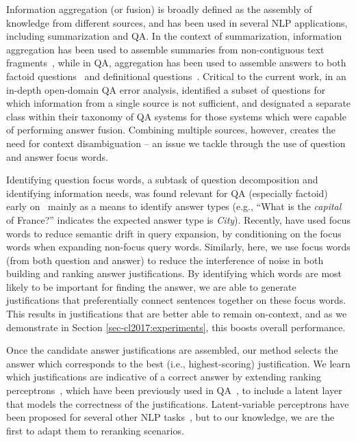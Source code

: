 Information aggregation (or fusion) is broadly defined as the assembly of knowledge from different sources, and has been used in several NLP applications, including summarization and QA.  In the context of summarization, information aggregation has been used to assemble summaries from non-contiguous text fragments~\citep[inter alia]{barzilay1999information,barzilay2005sentence}, while in QA, aggregation has been used to assemble answers to both factoid questions~\citep{pradhan2002building} and definitional questions~\citep{blair2003hybrid}.  Critical to the current work, in an in-depth open-domain QA error analysis, \citet{Moldovan:2003:PIE:763693.763694} identified a subset of questions for which information from a single source is not sufficient, and designated a separate class within their taxonomy of QA systems for those systems which were capable of performing answer fusion. Combining multiple sources, however, creates the need for context disambiguation -- an issue we tackle through the use of question and answer focus words.

Identifying question focus words, a subtask of question decomposition and identifying information needs, was found relevant for QA (especially factoid) early on~\citep[inter alia]{Harabagiu:00,Moldovan:2003:PIE:763693.763694} mainly as a means to identify answer types (e.g., ``What is the {\em capital} of France?'' indicates the expected answer type is \emph{City}).  
Recently, \citet{Park:2015} have used focus words to reduce semantic drift in query expansion, by conditioning on the focus words when expanding non-focus query words.
Similarly, here, we use focus words (from both question and answer) to reduce the interference of noise in both building and ranking answer justifications.  By identifying which words are most likely to be important for finding the answer, we are able to generate justifications that preferentially connect sentences together on these focus words.  This results in justifications that are better able to remain on-context, and as we demonstrate in Section \ref{sec-cl2017:experiments}, this boosts overall performance. 

Once the candidate answer justifications are assembled, our method selects the answer which corresponds to the best (i.e., highest-scoring) justification.  We learn which justifications are indicative of a correct answer by extending ranking perceptrons~\citep{Shen:Joshi:2005}, which have been previously used in QA~\citep{Surdeanu:11}, to include a latent layer that models the correctness of the justifications. Latent-variable perceptrons have been proposed for several other NLP tasks~\citep{liang2006end,zettlemoyer2007online,sun2009latent,hoffmann2011knowledge,fernandes2012latent,bjorkelund2014learning}, but to our knowledge, we are the first to adapt them to reranking scenarios. 



